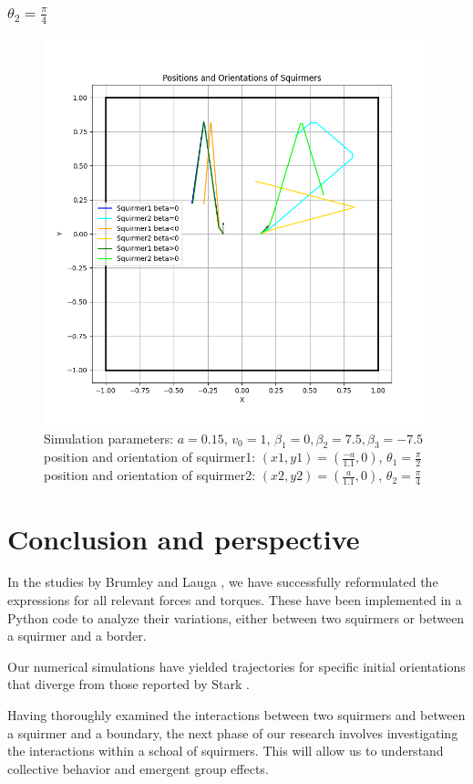 \documentclass{article}
\begin{document}
\subsubsection{$\theta_2 = \frac{\pi}{4}$}
\begin{figure}[h]
   \centering
   \includegraphics[width=1\textwidth]{graphs/simulations/bordersquirmer/sq2.pi.4.png}
   \caption{\footnotesize Simulation parameters: $a=0.15$, $v_0=1$, $\beta_1=0, \beta_2=7.5, \beta_3=-7.5$\\
   position and orientation of squirmer1: $(x1,y1)=(\frac{-a}{1.1},0)$, $\theta_1=\frac{\pi}{2}$\\
   position and orientation of squirmer2: $(x2,y2)=(\frac{a}{1.1},0)$, $\theta_2=\frac{\pi}{4}$}
\end{figure}

\newpage
\section{Conclusion and perspective}
 In the studies by Brumley \cite{Brumley} and Lauga \cite{Lauga}, we have successfully reformulated the expressions for all relevant forces and torques. These have been implemented in a Python code to analyze their variations, either between two squirmers or between a squirmer and a border.
 
 Our numerical simulations have yielded trajectories for specific initial orientations that diverge from those reported by Stark \cite{Stark}.
 
 Having thoroughly examined the interactions between two squirmers and between a squirmer and a boundary, the next phase of our research involves investigating the interactions within a schoal of squirmers. This will allow us to understand collective behavior and emergent group effects.
\newpage

\nocite{*}


\end{document}
